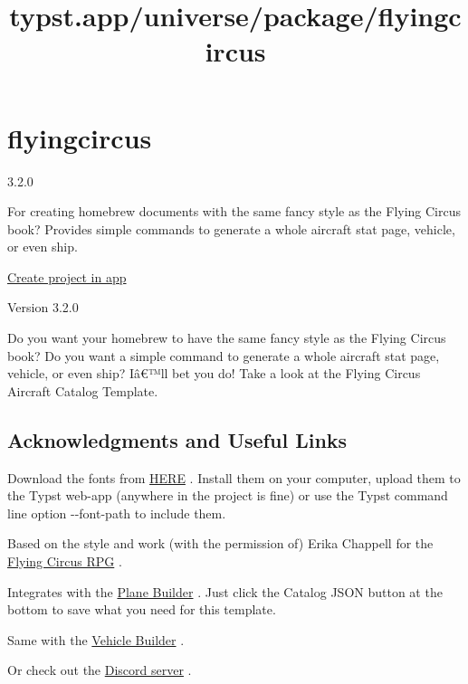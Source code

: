 \title{typst.app/universe/package/flyingcircus}

\label{banner}
\label{template-thumbnail}

\section{flyingcircus}\label{flyingcircus}

{ 3.2.0 }

For creating homebrew documents with the same fancy style as the Flying
Circus book? Provides simple commands to generate a whole aircraft stat
page, vehicle, or even ship.

\href{/app?template=flyingcircus&version=3.2.0}{Create project in app}

\label{readme}
Version 3.2.0

Do you want your homebrew to have the same fancy style as the Flying
Circus book? Do you want a simple command to generate a whole aircraft
stat page, vehicle, or even ship? Iâ€™ll bet you do! Take a look at the
Flying Circus Aircraft Catalog Template.

\subsection{Acknowledgments and Useful
Links}\label{acknowledgments-and-useful-links}

Download the fonts from
\href{https://github.com/Tetragramm/flying-circus-typst-template/archive/refs/heads/Fonts.zip}{HERE}
. Install them on your computer, upload them to the Typst web-app
(anywhere in the project is fine) or use the Typst command line option
-\/-font-path to include them.

Based on the style and work (with the permission of) Erika Chappell for
the \href{https://opensketch.itch.io/flying-circus}{Flying Circus RPG} .

Integrates with the
\href{https://tetragramm.github.io/PlaneBuilder/index.html}{Plane
Builder} . Just click the Catalog JSON button at the bottom to save what
you need for this template.

Same with the
\href{https://tetragramm.github.io/VehicleBuilder/}{Vehicle Builder} .

Or check out the \href{https://discord.gg/HKdyUuvmcb}{Discord server} .


